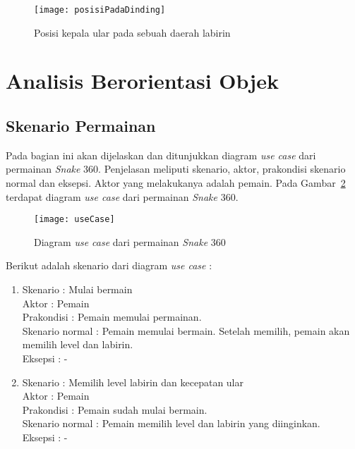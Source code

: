 \begin{figure}[H]
	\centering  
	\texttt{[image: posisiPadaDinding]}  
	\caption[Posisi kepala ular pada sebuah daerah labirin]{Posisi kepala ular pada sebuah daerah labirin}
	\label{fig:posisiPadaDinding} 
\end{figure}

\section{Analisis Berorientasi Objek}

\subsection{Skenario Permainan}
Pada bagian ini akan dijelaskan dan ditunjukkan diagram \textit{use case} dari permainan \textit{Snake} 360. Penjelasan meliputi skenario, aktor, prakondisi skenario normal dan eksepsi. Aktor yang melakukanya adalah pemain. Pada Gambar~\ref{fig:useCase} terdapat diagram \textit{use case} dari permainan \textit{Snake} 360.

\begin{figure}[H]
	\centering  
	\texttt{[image: useCase]}  
	\caption[Diagram \textit{use case} dari permainan \textit{Snake} 360]{Diagram \textit{use case} dari permainan \textit{Snake} 360}
	\label{fig:useCase} 
\end{figure}

Berikut adalah skenario dari diagram \textit{use case} :

\begin{enumerate}
	\item Skenario : Mulai bermain \\
Aktor : Pemain \\
Prakondisi : Pemain memulai permainan.\\
Skenario normal : Pemain memulai bermain. Setelah memilih, pemain akan memilih level dan labirin. \\
Eksepsi : - \\

	\item Skenario : Memilih level labirin dan kecepatan ular \\
Aktor : Pemain \\
Prakondisi : Pemain sudah mulai bermain. \\
Skenario normal : Pemain memilih level dan labirin yang diinginkan. \\ 
Eksepsi : - \\
\end{enumerate}

